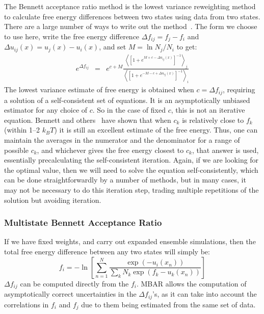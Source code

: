 \documentclass[superscriptaddress,showkeys, nofootinbib, pre, aps]{revtex4-1}
\begin{document}
The Bennett acceptance ratio method is the lowest variance reweighting method to calculate free energy differences between two states using data from two states.  There are a large number of ways to write out the method~\cite{bennett:jcp:1976:fe-estimate,shirts_comparison_2005,fenwick-escobedo:jcp:2003:replica-exchange-expanded-ensembles}.
The form we choose to use here, write the
free energy difference $\Delta f_{ij} = f_j-f_i$ and $\Delta u_{ij}(x)
= u_j(x)-u_i(x)$, and set $M = \ln N_j/N_i$ to get:
\begin{eqnarray}
e^{\Delta f_{ij}} &=& e^{c+M}\frac{\left \langle \left[1 + e^{M + c - \Delta u_{ij}(x)}\right]^{-1}\right \rangle_j}
  {\left \langle \left[1 + e^{-M - c + \Delta u_{ij}(x)}\right]^{-1}\right \rangle_i}
\end{eqnarray}
The lowest variance estimate of free energy is obtained when $c=\Delta
f_{ij}$, requiring a solution of a self-consistent set of equations. It is an asymptotically unbiased estimator for any choice
of $c$.  So in the case of fixed $c$, this is not an iterative
equation.  Bennett and others~\cite{fenwick-escobedo:jcp:2003:replica-exchange-expanded-ensembles,Paliwal_comparison_2011} have
shown that when $c_k$ is relatively close to $f_k$ (within 1--2 $k_B T$)
it is still an excellent estimate of the free energy.  Thus, one can
maintain the averages in the numerator and the denominator for a range
of possible $c_k$, and whichever gives the free energy closest to
$c_k$, that answer is used, essentially precalculating the
self-consistent iteration.  Again, if we are looking for the optimal value,
then we will need to solve the equation self-consistently, which can
be done straightforwardly by a number of methods, but in many cases, it may not be necessary to do this iteration step, trading multiple repetitions of the solution but avoiding iteration.

\subsubsection{Multistate Bennett Acceptance Ratio}
If we have fixed weights, and carry out expanded ensemble simulations, then the total free energy difference between any two states will simply be:
\[
f_i = -\ln \left[\sum_{n=1}^N \frac{\exp(-u_i(x_n))}{\sum_k N_k \exp(f_k-u_k(x_n))}\right]
\label{eq:MBAR}
\]
$\Delta f_{ij}$ can be computed directly from the $f_i$.  MBAR allows the computation of asymptotically correct uncertainties in the $\Delta
f_{ij}$'s, as it can take into account the correlations in $f_i$ and $f_j$ due to them being estimated from the same set of data.
\end{document}
